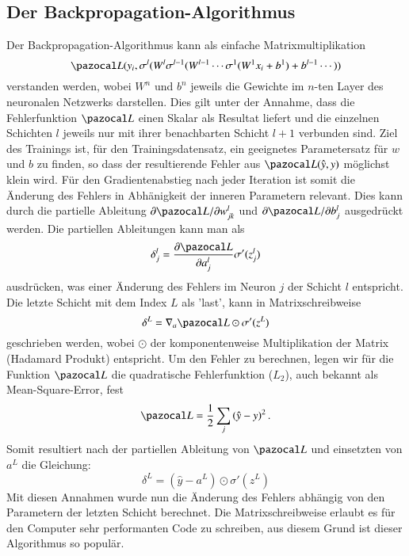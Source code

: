 \subsection{Der Backpropagation-Algorithmus}
Der Backpropagation-Algorithmus kann als einfache Matrixmultiplikation
\begin{equation}
\Lb(y_{i}, \sigma^{l}(W^{l}\sigma^{l-1}(W^{l-1}\cdots \sigma^{1}(W^{1}x_i+b^{1}) + b^{l-1} \cdots ) )
\end{equation}
verstanden werden, wobei $W^{n}$ und $b^{n}$ jeweils die Gewichte im $n$-ten Layer des neuronalen Netzwerks darstellen. Dies gilt unter der Annahme, dass die Fehlerfunktion $\Lb$ einen Skalar als Resultat liefert und die einzelnen Schichten $l$ jeweils nur mit ihrer benachbarten Schicht $l+1$ verbunden sind. Ziel des Trainings ist, für den Trainingsdatensatz, ein geeignetes Parametersatz für $w$ und $b$ zu finden, so dass der resultierende Fehler aus $\Lb(\hat{y}, y)$ möglichst klein wird. Für den Gradientenabstieg nach jeder Iteration ist somit die Änderung des Fehlers in Abhänigkeit der inneren Parametern relevant. Dies kann durch die partielle Ableitung $\partial \Lb / \partial w^l_{jk}$ und $\partial \Lb / \partial b^l_j$ ausgedrückt werden. Die partiellen Ableitungen kann man als 
\begin{equation}
\delta^{l}_{j} = \frac{\partial \Lb}{\partial a^{l}_{j}} \sigma'(z^l_j)
\end{equation}
ausdrücken, was einer Änderung des Fehlers im Neuron $j$ der Schicht $l$ entspricht. Die letzte Schicht mit dem Index $L$ als 'last', kann in Matrixschreibweise
\begin{equation}
\delta^{L} = \nabla_a \Lb \odot \sigma'(z^L)
\end{equation}
geschrieben werden, wobei $\odot$ der komponentenweise Multiplikation der Matrix (Hadamard Produkt) entspricht. Um den Fehler zu berechnen, legen wir für die Funktion $\Lb$ die quadratische Fehlerfunktion ($L_2$), auch bekannt als Mean-Square-Error, fest
\begin{equation}
\Lb = \frac{1}{2} \sum_j \left( \hat{y} - y \right)^2 \text{.}
\end{equation}
Somit resultiert nach der partiellen Ableitung von $\Lb$ und einsetzten von $a^L$ die Gleichung:
\begin{equation}
\delta^{L} = (\hat{y} - a^L) \odot \sigma'(z^L)
\end{equation}
Mit diesen Annahmen wurde nun die Änderung des Fehlers abhängig von den Parametern der letzten Schicht berechnet. Die Matrixschreibweise erlaubt es für den Computer sehr performanten Code zu schreiben, aus diesem Grund ist dieser Algorithmus so populär. 

